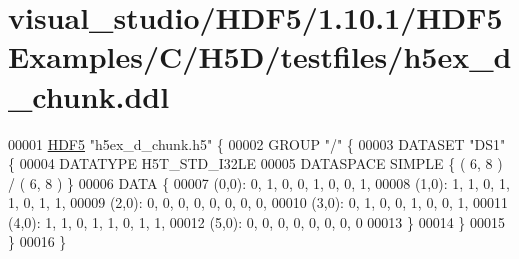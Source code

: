 \hypertarget{visual__studio_2_h_d_f5_21_810_81_2_h_d_f5_examples_2_c_2_h5_d_2testfiles_2h5ex__d__chunk_8ddl_source}{}\section{visual\+\_\+studio/\+H\+D\+F5/1.10.1/\+H\+D\+F5\+Examples/\+C/\+H5\+D/testfiles/h5ex\+\_\+d\+\_\+chunk.ddl}
\label{visual__studio_2_h_d_f5_21_810_81_2_h_d_f5_examples_2_c_2_h5_d_2testfiles_2h5ex__d__chunk_8ddl_source}

\begin{DoxyCode}
00001 \hyperlink{namespace_h_d_f5}{HDF5} \textcolor{stringliteral}{"h5ex\_d\_chunk.h5"} \{
00002 GROUP \textcolor{stringliteral}{"/"} \{
00003    DATASET \textcolor{stringliteral}{"DS1"} \{
00004       DATATYPE  H5T\_STD\_I32LE
00005       DATASPACE  SIMPLE \{ ( 6, 8 ) / ( 6, 8 ) \}
00006       DATA \{
00007       (0,0): 0, 1, 0, 0, 1, 0, 0, 1,
00008       (1,0): 1, 1, 0, 1, 1, 0, 1, 1,
00009       (2,0): 0, 0, 0, 0, 0, 0, 0, 0,
00010       (3,0): 0, 1, 0, 0, 1, 0, 0, 1,
00011       (4,0): 1, 1, 0, 1, 1, 0, 1, 1,
00012       (5,0): 0, 0, 0, 0, 0, 0, 0, 0
00013       \}
00014    \}
00015 \}
00016 \}
\end{DoxyCode}
